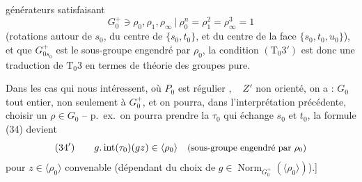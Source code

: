\documentclass[11pt,a4paper]{article}
\begin{document}
générateurs satisfaisant
\[
G_0^{+} \ni \rho_0, \rho_1, \rho_\infty \ \big| \ \rho_0^{n} = \rho_1^{2} = \rho_\infty^{3} = 1
\]
(rotations autour de $s_0$, du centre de $\{s_0, t_0\}$, et du centre de la face $\{s_0, t_0, u_0\}$), et que $G_{0s_0}^{+}$ est le sous-groupe engendré par $\rho_0$, la condition $(\text{T}_0 3')$ est donc une traduction de $\text{T}_0 3$ en termes de théorie des groupes pure. \struck{\ill{}}


Dans les cas qui nous intéressent, où $P_0$ est régulier  , \     \struck{\ill{}} $Z'$ non orienté, on a    : $G_0$ tout entier, non seulement à $G_0^{+}$, et on pourra, dans l'interprétation précédente, choisir un $\rho \in G_0$ -- p.\ ex.\ on pourra prendre la   $\tau_0$ \struck{\ill{}} qui échange $s_0$ et $t_0$, la formule (34) devient
\[
(34') \qquad g . \operatorname{int}(\tau_0)(g z) \in \langle \rho_0 \rangle
\quad \text{\small (sous-groupe engendré par $\rho_0$)}
\]
pour $z \in \langle \rho_0 \rangle$ convenable (dépendant du choix de $g \in \operatorname{Norm}_{G_0^{+}}(\langle \rho_0 \rangle)$).]
\end{document}
